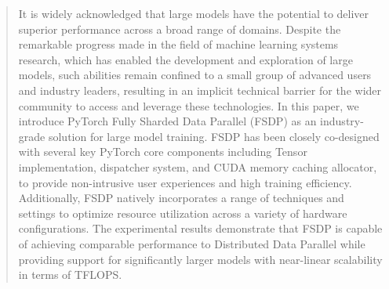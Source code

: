\begin{abstract}
It is widely acknowledged that large models have the potential to deliver superior performance across a broad range of domains. Despite the remarkable progress made in the field of machine learning systems research, which has enabled the development and exploration of large models, such abilities remain confined to a small group of advanced users and industry leaders, resulting in an implicit technical barrier for the wider community to access and leverage these technologies. In this paper, we introduce PyTorch Fully Sharded Data Parallel (FSDP) as an industry-grade solution for large model training. FSDP has been closely co-designed with several key PyTorch core components including Tensor implementation, dispatcher system, and CUDA memory caching allocator, to provide non-intrusive user experiences and high training efficiency. Additionally, FSDP natively incorporates a range of techniques and settings to optimize resource utilization across a variety of hardware configurations. The experimental results demonstrate that FSDP is capable of achieving comparable performance to Distributed Data Parallel while providing support for significantly larger models with near-linear scalability in terms of TFLOPS.
\end{abstract}